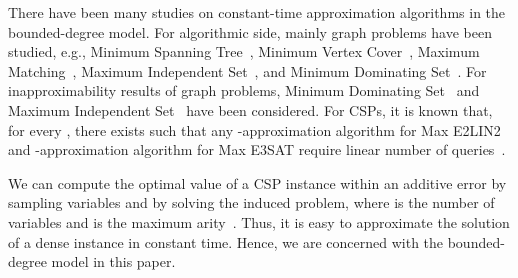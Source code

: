 \documentclass[letterpaper, 11pt]{article}
\begin{document}
There have been many studies on constant-time approximation algorithms in the bounded-degree model.
For algorithmic side,
mainly graph problems have been studied,
e.g., \textsf{Minimum Spanning Tree}~\cite{CRT01},
\textsf{Minimum Vertex Cover}~\cite{NO08,PR07,YYI09}, 
\textsf{Maximum Matching}~\cite{NO08,YYI09}, 
\textsf{Maximum Independent Set}~\cite{Alo10},
and \textsf{Minimum Dominating Set}~\cite{NO08,YYI09}.
For inapproximability results of graph problems,
\textsf{Minimum Dominating Set}~\cite{Alo10} and \textsf{Maximum Independent Set}~\cite{Alo10,Yos10} have been considered.
For CSPs,
it is known that, for every , 
there exists  such that any -approximation algorithm for \textsf{Max E2LIN2} and -approximation algorithm for \textsf{Max E3SAT} require linear number of queries~\cite{BOT02}.

We can compute the optimal value of a CSP instance within an additive error  by sampling  variables and by solving the induced problem,
where  is the number of variables and  is the maximum arity~\cite{AdlVKK03,AE02}.
Thus, it is easy to approximate the solution of a dense instance in constant time.
Hence, we are concerned with the bounded-degree model in this paper.

\vspace{-10pt}
\end{document}
